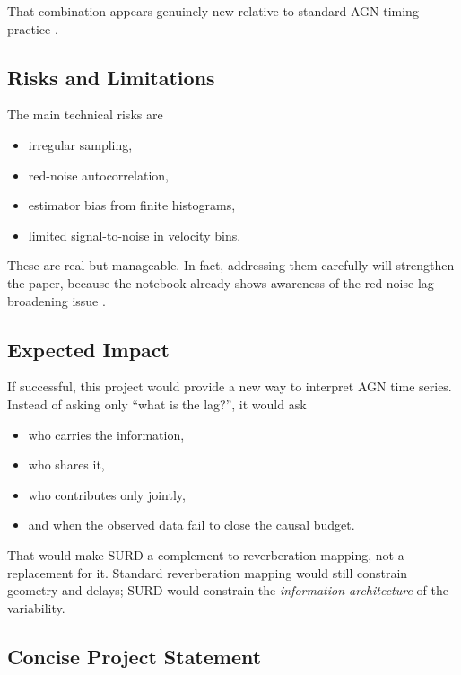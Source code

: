 \documentclass{article}
\begin{document}
That combination appears genuinely new relative to standard AGN timing practice \cite{AGN_SURD_notebook,CackettHorneWinkler2021,Dehghanian2019,LuEtAl2022,FengEtAl2024}.

\subsection{Risks and Limitations}

The main technical risks are
\begin{itemize}
    \item irregular sampling,
    \item red-noise autocorrelation,
    \item estimator bias from finite histograms,
    \item limited signal-to-noise in velocity bins.
\end{itemize}

These are real but manageable. In fact, addressing them carefully will strengthen the paper, because the notebook already shows awareness of the red-noise lag-broadening issue \cite{AGN_SURD_notebook}.

\subsection{Expected Impact}

If successful, this project would provide a new way to interpret AGN time series. Instead of asking only ``what is the lag?'', it would ask
\begin{itemize}
    \item who carries the information,
    \item who shares it,
    \item who contributes only jointly,
    \item and when the observed data fail to close the causal budget.
\end{itemize}

That would make SURD a complement to reverberation mapping, not a replacement for it. Standard reverberation mapping would still constrain geometry and delays; SURD would constrain the \emph{information architecture} of the variability.

\subsection{Concise Project Statement}
\end{document}
